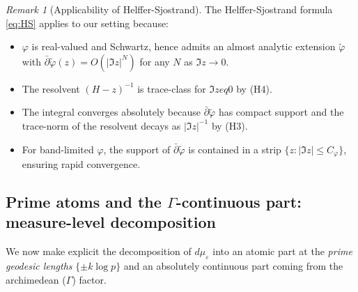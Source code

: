 ﻿\documentclass[12pt,a4paper]{article}
\theoremstyle{definition}
\theoremstyle{remark}
\newtheorem{remark}[theorem]{Remark}
\begin{document}
\begin{remark}[Applicability of Helffer-Sjostrand]
\label{rem:HS-applicable}
The Helffer-Sjostrand formula \eqref{eq:HS} applies to our setting because:
\begin{itemize}
\item $\varphi$ is real-valued and Schwartz, hence admits an almost analytic extension $\tilde{\varphi}$ with $\bar{\partial}\tilde{\varphi}(z) = O(|\Im z|^N)$ for any $N$ as $\Im z \to 0$.
\item The resolvent $(H-z)^{-1}$ is trace-class for $\Im z 
eq 0$ by (H4).
\item The integral converges absolutely because $\bar{\partial}\tilde{\varphi}$ has compact support and the trace-norm of the resolvent decays as $|\Im z|^{-1}$ by (H3).
\item For band-limited $\varphi$, the support of $\bar{\partial}\tilde{\varphi}$ is contained in a strip $\{z : |\Im z| \le C_\varphi\}$, ensuring rapid convergence.
\end{itemize}
\end{remark}

\subsection{Prime atoms and the $\Gamma$-continuous part: measure-level decomposition}

We now make explicit the decomposition of $d\mu_\varepsilon$ into an atomic part at the \emph{prime geodesic lengths} $\{\pm k\log p\}$ and an absolutely continuous part coming from the archimedean ($\Gamma$) factor.
\end{document}
